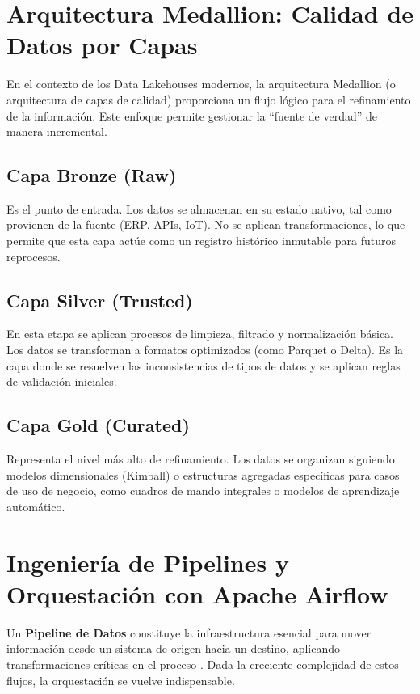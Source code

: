 \section{Arquitectura Medallion: Calidad de Datos por Capas}

En el contexto de los Data Lakehouses modernos, la arquitectura Medallion (o arquitectura de capas de calidad) proporciona un flujo lógico para el refinamiento de la información. Este enfoque permite gestionar la ``fuente de verdad'' de manera incremental.

\subsection{Capa Bronze (Raw)}

Es el punto de entrada. Los datos se almacenan en su estado nativo, tal como provienen de la fuente (ERP, APIs, IoT). No se aplican transformaciones, lo que permite que esta capa actúe como un registro histórico inmutable para futuros reprocesos.

\subsection{Capa Silver (Trusted)}

En esta etapa se aplican procesos de limpieza, filtrado y normalización básica. Los datos se transforman a formatos optimizados (como Parquet o Delta). Es la capa donde se resuelven las inconsistencias de tipos de datos y se aplican reglas de validación iniciales.

\subsection{Capa Gold (Curated)}

Representa el nivel más alto de refinamiento. Los datos se organizan siguiendo modelos dimensionales (Kimball) o estructuras agregadas específicas para casos de uso de negocio, como cuadros de mando integrales o modelos de aprendizaje automático.





\section{Ingeniería de Pipelines y Orquestación con Apache Airflow}

Un \textbf{Pipeline de Datos} constituye la infraestructura esencial para mover información desde un sistema de origen hacia un destino, aplicando transformaciones críticas en el proceso \parencite{harenslak2021data}. Dada la creciente complejidad de estos flujos, la orquestación se vuelve indispensable.

